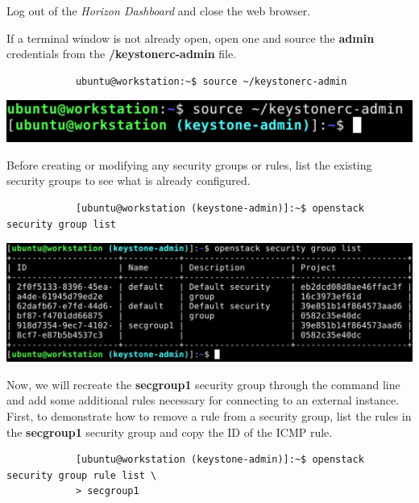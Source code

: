 \documentclass[letterpaper, 12pt]{article}
\begin{document}
\begin{enumerate}
    \begin{labstep}
        Log out of the \textit{Horizon Dashboard} and close the web browser.
    \end{labstep}

    \begin{labstep}
        If a terminal window is not already open, open one and source the \textbf{admin} credentials from the
        \textbf{\texttildemid/keystonerc-admin} file.
        \begin{lstlisting}
            ubuntu@workstation:~$ source ~/keystonerc-admin
        \end{lstlisting}

        \begin{center}
            \includegraphics[width=\linewidth]{images/part5/step9.png}
        \end{center}
    \end{labstep}

    \begin{labstep}
        Before creating or modifying any security groups or rules, list the existing security groups to see what is already configured.
        \begin{lstlisting}
            [ubuntu@workstation (keystone-admin)]:~$ openstack security group list
        \end{lstlisting}

        \begin{center}
            \includegraphics[width=\linewidth]{images/part5/step10.png}
        \end{center}
    \end{labstep}

    \begin{labstep}
        Now, we will recreate the \textbf{secgroup1} security group through the command line and add some additional rules necessary for connecting to an external instance.
        First, to demonstrate how to remove a rule from a security group, list the rules in the \textbf{secgroup1} security group and copy the ID of the ICMP rule.
        \begin{lstlisting}
            [ubuntu@workstation (keystone-admin)]:~$ openstack security group rule list \
            > secgroup1
        \end{lstlisting}


\end{labstep}
\end{enumerate}
\end{document}
